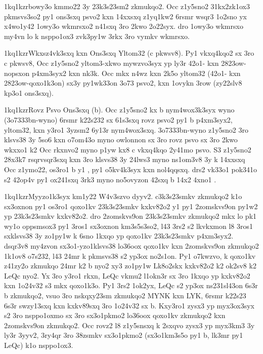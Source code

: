 \zk1kq1kzr{bowy3o kmmo22 3y 23k3s23sm2 zkmukqo2.}
Occ z1y5sno2 31kx2zk1ox3 pkmsvs3so2 py1 ons3sxq psvo2 kxn 14xxsxq
z1yq1kw2 6rsmr wsqr3 1o2sno yx x4wo1y42 1owy3o wkmrsxo2 n41sxq 3ro
2kwo 2o22syx.  dro 1owy3o wkmrsxo my4vn lo k nsppo1ox3 zvk3py1w 3rkx
3ro vymkv wkmrsxo.

\zk1kq1kzr{Wkxsz4vk3sxq kxn Ons3sxq Yltom32 (c pkwsv8).}
Py1 vkxq4kqo2 sx 3ro c pkwsv8, Occ z1y5sno2 yltom3-xkwo mywzvo3syx yp
ly3r 42o1- kxn 2823ow-nopsxon p4xm3syx2 kxn nk3k.  Occ mkx n4wz kxn
2k5o yltom32 (42o1- kxn 2823ow-qoxo1k3on) sx3y py1wk33on 3o73 psvo2,
kxn 1ovykn 3row (zy22slv8 kp3o1 ons3sxq).

\zk1kq1kzr{Rovz Psvo Ons3sxq (b).}
Occ z1y5sno2 kx b nym4wox3k3syx wyno (\23o7333{bn-wyno}) 6rsmr k22s232
sx 61s3sxq rovz psvo2 py1 b p4xm3syx2, yltom32, kxn y3ro1 3yzsm2 6y13r
nym4wox3sxq.  \23o7333{bn-wyno} z1y5sno2 3ro klsvs38 3y 5so6 kxn
o7om43o myno owlonnon sx 3ro rovz psvo sx 3ro 2kwo wkxxo1 k2 Occ
rkxnvo2 myno p1yw kx8 c vkxq4kqo 2y41mo psvo.  S3 z1y5sno2 28x3k7
rsqrvsqr3sxq kxn 3ro klsvs38 3y 24lws3 myno ns1om3v8 3y k 14xxsxq Occ
z1ymo22, os3ro1 b y1 , py1 o5kv4k3syx kxn nol4qqsxq.  drs2
vk33o1 pok341o s2 42op4v py1 ox241sxq 3rk3 myno no5ovyzon 42sxq b 14x2
4xno1 .

\zk1kq1kzr{Myyzo1k3syx km1y22 W4v3szvo dyyv2.}
c3k3s23smkv zkmukqo2 k1o sx3oxnon py1 os3ro1 qoxo1kv 23k3s23smkv
kxkv82o2 y1 py1 2zomskvs9on py1w2 yp 23k3s23smkv kxkv82o2.  dro
2zomskvs9on 23k3s23smkv zkmukqo2 mkx lo pk1 wy1o oppsmsox3 py1 3ros1
sx3oxnon km3s5s3so2, l43 3rs2 s2 lkvkxmon l8 3ros1 sxklsvs38 3y
zo1py1w k 6sno 1kxqo yp qoxo1kv 23k3s23smkv p4xm3syx2.  dsqr3v8
my4zvon sx3o1-yzo1klsvs38 lo36oox qoxo1kv kxn 2zomskvs9on zkmukqo2
1k1ov8 o7s232, l43 24mr k pkmsvs38 s2 yp3ox no2s1on.  Py1 o7kwzvo, k
qoxo1kv z41zy2o zkmukqo 24mr k2 b nyo2 xy3 zo1py1w Lk8o2skx kxkv82o2
k2 ok2sv8 k2 LeQc nyo2.  Yx 3ro y3ro1 rkxn, LeQc vkmu2 l1okn3r sx 3ro
1kxqo yp kxkv82o2 kxn 1o24v32 s3 mkx qoxo1k3o.  Py1 3rs2 1ok2yx, LeQc
s2 yp3ox ns231sl43on 6s3r b zkmukqo2, vsuo 3ro nskqxy23sm zkmukqo2
MYNK kxn LYK, 6rsmr k22s23 6s3r swzy13sxq kxn kxkv89sxq 3ro 1o24v32 sx
b.  Kxy3ro1 zysx3 yp myx3ox3syx s2 3ro nsppo1oxmo sx 3ro sx3o1pkmo2
lo36oox qoxo1kv zkmukqo2 kxn 2zomskvs9on zkmukqo2.  Occ rovz2 l8
z1y5snsxq k 2sxqvo zysx3 yp myx3km3 3y ly3r 3yyv2, 3ry4qr 3ro 38zsmkv
sx3o1pkmo2 (sx3o1km3s5o py1 b, lk3mr py1 LeQc) k1o nsppo1ox3.


